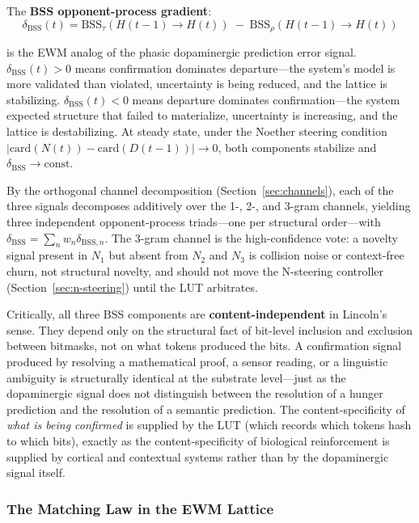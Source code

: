 \documentclass[11pt,a4paper]{article}
\theoremstyle{remark}
\begin{document}
The \textbf{BSS opponent-process gradient}:
\begin{equation}
  \delta_{\text{BSS}}(t) = \text{BSS}_{\tau}(H(t-1) \to H(t)) \;-\;
  \text{BSS}_{\rho}(H(t-1) \to H(t))
\end{equation}

is the EWM analog of the phasic dopaminergic prediction error signal.
$\delta_{\text{BSS}}(t) > 0$ means confirmation dominates departure---the
system's model is more validated than violated, uncertainty is being reduced,
and the lattice is stabilizing. $\delta_{\text{BSS}}(t) < 0$ means departure
dominates confirmation---the system expected structure that failed to
materialize, uncertainty is increasing, and the lattice is destabilizing. At
steady state, under the Noether steering condition $|\text{card}(N(t)) -
\text{card}(D(t-1))| \to 0$, both components stabilize and $\delta_{\text{BSS}}
\to \text{const}$.

By the orthogonal channel decomposition (Section~\ref{sec:channels}), each of
the three signals decomposes additively over the 1-, 2-, and 3-gram channels,
yielding three independent opponent-process triads---one per structural
order---with $\delta_{\text{BSS}} = \sum_n w_n \delta_{\text{BSS},n}$. The
3-gram channel is the high-confidence vote: a novelty signal present in $N_1$
but absent from $N_2$ and $N_3$ is collision noise or context-free churn, not
structural novelty, and should not move the N-steering controller
(Section~\ref{sec:n-steering}) until the LUT arbitrates.

Critically, all three BSS components are \textbf{content-independent} in
Lincoln's sense. They depend only on the structural fact of bit-level inclusion
and exclusion between bitmasks, not on what tokens produced the bits. A
confirmation signal produced by resolving a mathematical proof, a sensor
reading, or a linguistic ambiguity is structurally identical at the substrate
level---just as the dopaminergic signal does not distinguish between the
resolution of a hunger prediction and the resolution of a semantic prediction.
The content-specificity of \textit{what is being confirmed} is supplied by the
LUT (which records which tokens hash to which bits), exactly as the
content-specificity of biological reinforcement is supplied by cortical and
contextual systems rather than by the dopaminergic signal itself.

\subsubsection{The Matching Law in the EWM Lattice}
\end{document}
